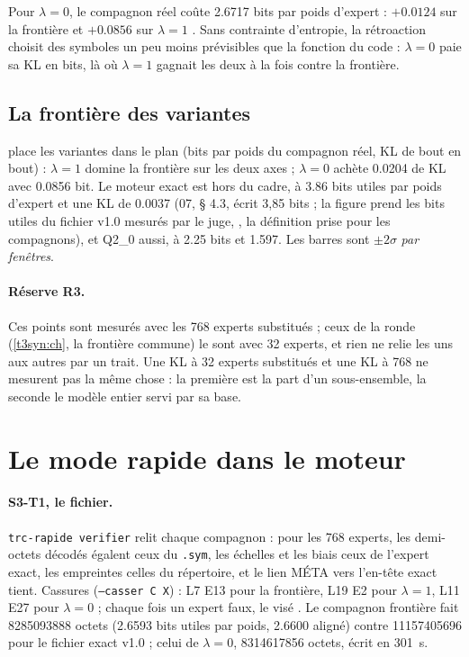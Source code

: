 Pour $\lambda = 0$, le compagnon réel coûte \num{2.6717} bits par poids d'expert : $+\num{0.0124}$ sur la frontière et $+\num{0.0856}$ sur $\lambda = 1$ \mes. Sans contrainte d'entropie, la rétroaction choisit des symboles un peu moins prévisibles que la fonction du code : $\lambda = 0$ paie sa KL en bits, là où $\lambda = 1$ gagnait les deux à la fois contre la frontière.

\subsection{La frontière des variantes}\label{t3sno:sec:variantes}

 place les variantes dans le plan (bits par poids du compagnon réel, KL de bout en bout) : $\lambda = 1$ domine la frontière sur les deux axes ; $\lambda = 0$ achète \num{0.0204} de KL avec \num{0.0856} bit. Le moteur exact est hors du cadre, à \num{3.86} bits utiles par poids d'expert et une KL de \num{0.0037} (07, § 4.3, écrit 3,85 bits ; la figure prend les bits utiles du fichier v1.0 mesurés par le juge, , la définition prise pour les compagnons), et Q2\_0 aussi, à \num{2.25} bits et \num{1.597}. Les barres sont $\pm 2\sigma$ \emph{par fenêtres}.

\begin{figure}[tbp]
\centering
\GrapheSynoVariantes
{}
\label{fig:t3-syno-variantes}
\end{figure}

\paragraph{Réserve R3.} Ces points sont mesurés avec les 768 experts substitués ; ceux de la ronde (\cref{t3syn:ch}, la frontière commune) le sont avec 32 experts, et rien ne relie les uns aux autres par un trait. Une KL à 32 experts substitués et une KL à 768 ne mesurent pas la même chose : la première est la part d'un sous-ensemble, la seconde le modèle entier servi par sa base.

\section{Le mode rapide dans le moteur}\label{t3sno:sec:moteur}

\paragraph{S3-T1, le fichier.} \texttt{trc-rapide verifier} relit chaque compagnon : pour les 768 experts, les demi-octets décodés égalent ceux du \texttt{.sym}, les échelles et les biais ceux de l'expert exact, les empreintes celles du répertoire, et le lien MÉTA vers l'en-tête exact tient. Cassures (\texttt{--casser C X}) : L7 E13 pour la frontière, L19 E2 pour $\lambda = 1$, L11 E27 pour $\lambda = 0$ ; chaque fois un expert faux, le visé \mes. Le compagnon frontière fait \num{8285093888} octets (\num{2.6593} bits utiles par poids, \num{2.6600} aligné) contre \num{11157405696} pour le fichier exact v1.0 ; celui de $\lambda = 0$, \num{8314617856} octets, écrit en \SI{301}{\second}.

